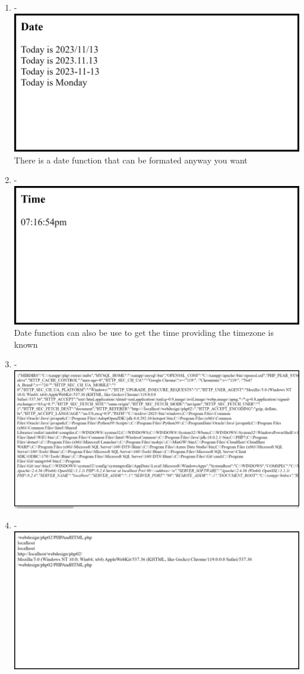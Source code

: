 \documentclass[12pt,titlepage]{article}
\begin{document}
\begin{enumerate}
    \item - \\ \includegraphics[width=.9\textwidth]{images/figures/fig19_b.png} \\ There is a date function that can be formated anyway you want
    \item - \\ \includegraphics[width=.9\textwidth]{images/figures/fig20.png} \\ Date function can also be use to get the time providing the timezone is known
    
    \newpage

    \item - \\ \includegraphics[width=.9\textwidth]{images/figures/fig21.png}
    \item - \\ \includegraphics[width=.9\textwidth]{images/figures/fig22.png}
    

\end{enumerate}
\end{document}
